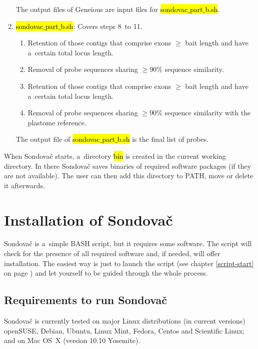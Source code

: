 \documentclass[a4paper, 11pt, twoside]{article}
\renewcommand{\texttt}[1]{\hl{\ttfamily #1}}
\begin{document}
\begin{enumerate}[label=\textbf{\Alph*.}]
  The output files of Geneious are input files for \texttt{sondovac$\_$part$\_$b.sh}.

  \item \texttt{sondovac$\_$part$\_$b.sh}: Covers steps 8~to 11.
    \begin{enumerate}[label=\textbf{\arabic*.}, resume]
      \item Retention of those contigs that comprise exons $\geq$ bait length and have a~certain total locus length.
      \item Removal of probe sequences sharing $\geq$90\% sequence similarity.
      \item Retention of those contigs that comprise exons $\geq$ bait length and have a~certain total locus length.
      \item Removal of probe sequences sharing $\geq$90\% sequence similarity with the plastome reference.
    \end{enumerate}

  The output file of \texttt{sondovac$\_$part$\_$b.sh} is the final list of probes.

\end{enumerate}

When Sondovač starts, a~directory \texttt{bin} is created in the current working directory. In there Sondovač saves binaries of required software packages (if they are not available). The user can then add this directory to PATH, move or delete it afterwards.

\section{Installation of Sondovač}
\label{install}

Sondovač is a~simple BASH script, but it requires some software. The script will check for the presence of all required software and, if needed, will offer installation. The easiest way is just to launch the script (see chapter \ref{script-start} on page \pageref{script-start}) and let yourself to be guided through the whole process.

\subsection{Requirements to run Sondovač}

Sondovač is currently tested on major Linux distributions (in current versions) openSUSE, Debian, Ubuntu, Linux Mint, Fedora, Centos and Scientific Linux; and on Mac OS~X (version 10.10 Yosemite).
\end{document}
